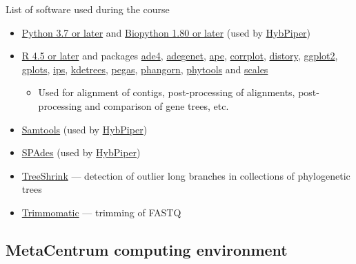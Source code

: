 \documentclass[compress,  xelatex, 11pt, xcolor=x11names, aspectratio=169,
	hyperref={
		bookmarks=true,
		unicode=true,
		colorlinks=true,
		pdftitle={HybSeq course},
		plainpages=false,
		pdfauthor={Vojtech Zeisek},
		pdfsubject={Practical processing of HybSeq target enrichment sequencing data on computing grids like MetaCentrum},
		pdfcreator={XeLaTeX},
		pdfkeywords={BASH, command line, GNU, HybSeq, Linux, MetaCentrum, sequencing shell, target enrichment},
		linkcolor=Turquoise4, %
		anchorcolor=DodgerBlue4, %
		citecolor=DodgerBlue4, %
		filecolor=DodgerBlue4, %
		menucolor=Tan4, %
		urlcolor=DarkOliveGreen4 %
		},
	url={hyphens, lowtilde} %
	]{beamer}
\begin{document}
\begin{frame}[allowframebreaks]{List of software used during the course}
\begin{itemize}
		\item \href{https://www.python.org/}{Python 3.7 or later} and \href{https://biopython.org/}{Biopython 1.80 or later} (used by \href{https://github.com/mossmatters/HybPiper/wiki}{HybPiper})
		\item \href{https://www.r-project.org/}{R 4.5 or later} and packages \href{https://cran.r-project.org/package=ade4}{ade4}, \href{https://cran.r-project.org/package=adegenet}{adegenet}, \href{https://cran.r-project.org/package=ape}{ape}, \href{https://cran.r-project.org/package=corrplot}{corrplot}, \href{https://cran.r-project.org/package=distory}{distory}, \href{https://cran.r-project.org/package=ggplot2}{ggplot2}, \href{https://cran.r-project.org/package=gplots}{gplots}, \href{https://cran.r-project.org/package=ips}{ips}, \href{https://github.com/V-Z/kdetrees}{kdetrees}, \href{https://cran.r-project.org/package=pegas}{pegas}, \href{https://cran.r-project.org/package=phangorn}{phangorn}, \href{https://cran.r-project.org/package=phytools}{phytools} and \href{https://cran.r-project.org/package=scales}{scales}
		\begin{itemize}
			\item Used for alignment of contigs, post-processing of alignments, post-processing and comparison of gene trees, etc.
		\end{itemize}
		\item \href{https://www.htslib.org/}{Samtools} (used by \href{https://github.com/mossmatters/HybPiper/wiki}{HybPiper})
		\item \href{https://github.com/ablab/spades}{SPAdes} (used by \href{https://github.com/mossmatters/HybPiper/wiki}{HybPiper})
		\item \href{https://github.com/uym2/TreeShrink}{TreeShrink} --- detection of outlier long branches in collections of phylogenetic trees
		\item \href{http://www.usadellab.org/cms/?page=trimmomatic}{Trimmomatic} --- trimming of FASTQ
	\end{itemize}
\end{frame}

\subsection{MetaCentrum computing environment}
\end{document}
